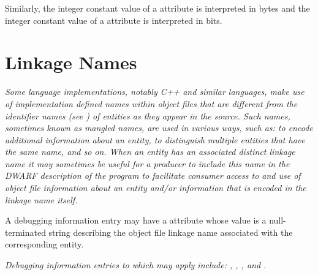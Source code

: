 Similarly, the integer
constant value of a  attribute is interpreted
in bytes and the integer constant value of a 
attribute is interpreted in bits.

\section{Linkage Names}
\label{chap:linkagenames}
\textit{Some language implementations, notably C++ and similar
languages, make use of implementation defined names within
object files that are different from the identifier names
(see ) of entities as they appear in the
source. Such names, sometimes known as mangled names,
are used in various ways, such as: to encode additional
information about an entity, to distinguish multiple entities
that have the same name, and so on. When an entity has an
associated distinct linkage name it may sometimes be useful
for a producer to include this name in the DWARF description
of the program to facilitate consumer access to and use of
object file information about an entity and/or information
that is encoded in the linkage name itself.  
}

A debugging
information entry may have a  attribute
whose value is a null-terminated string describing the object
file linkage name associated with the corresponding entity.

\textit{Debugging information entries to which 
may apply include: , ,
,  
and .
}
